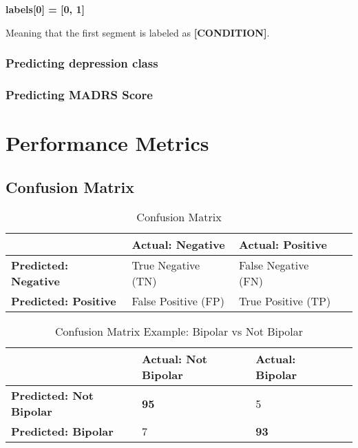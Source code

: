 \textbf{labels[0] = [0, 1]}

\noindent Meaning that the first segment is labeled as \textbf{[CONDITION]}.

\subsubsection{Predicting depression class}


\subsubsection{Predicting MADRS Score}

\section{Performance Metrics}
\subsection{Confusion Matrix}

\begin{table}
  \begin{center}
    \begin{tabular}{| l | l | l | l |}
      \hline
                                    & \textbf{Actual: Negative} & \textbf{Actual: Positive} \\ \hline
      \textbf{Predicted: Negative}  & True Negative (TN)        & False Negative (FN)       \\ \hline
      \textbf{Predicted: Positive}  & False Positive (FP)       & True Positive (TP)        \\
      \hline
    \end{tabular}
    \caption{Confusion Matrix}
    \label{table:confusion_matrix}
  \end{center}
\end{table}

\begin{table}
  \begin{center}
    \begin{tabular}{| l | l | l | l |}
      \hline
                                      & \textbf{Actual: Not Bipolar} & \textbf{Actual: Bipolar} \\ \hline
      \textbf{Predicted: Not Bipolar} & \textbf{95}                  & 5                        \\ \hline
      \textbf{Predicted: Bipolar}     & 7                            & \textbf{93}              \\
      \hline
    \end{tabular}
    \caption{Confusion Matrix Example: Bipolar vs Not Bipolar}
    \label{table:confusion_matrix_bipolar}
  \end{center}
\end{table}

